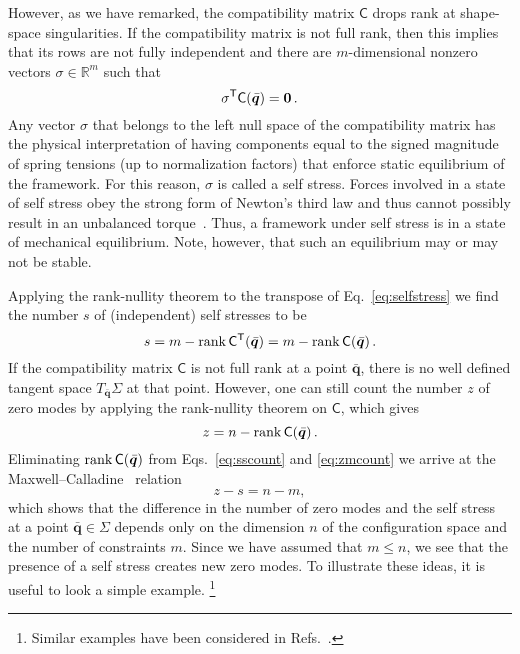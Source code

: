 However, as we have remarked, the compatibility matrix $\mathsf{C}$ drops rank at shape-space singularities.
If the compatibility matrix is not full rank, then this implies that its rows are not fully independent and there are $m$-dimensional nonzero vectors $\sigma \in \mathbb{R}^m$ such that
%
\begin{equation}
  \sigma^\mathsf{T}\mathsf{C}(\bar{\bm{q}}) = \bm{0}\,.\label{eq:selfstress}
\end{equation}
%
Any vector $\sigma$ that belongs to the left null space of the compatibility matrix has the physical interpretation of having components equal to the signed magnitude of spring tensions (up to normalization factors) that enforce static equilibrium of the framework.
For this reason, $\sigma$ is called a self stress.
Forces involved in a state of self stress obey the strong form of Newton's third law and thus cannot possibly result in an unbalanced torque~\cite{goldstein2002}.
Thus, a framework under self stress is in a state of mechanical equilibrium.
Note, however, that such an equilibrium may or may not be stable.

Applying the rank-nullity theorem to the transpose of Eq.~\eqref{eq:selfstress} we find the number $s$ of (independent) self stresses to be
%
\begin{equation}
  s = m - \operatorname{rank}{\mathsf{C}^\mathsf{T}(\bar{\bm{q}})} = m - \operatorname{rank}{\mathsf{C}(\bar{\bm{q}})}\,.\label{eq:sscount}
\end{equation}
%
If the compatibility matrix $\mathsf{C}$ is not full rank at a point $\bar{\bm{q}}$, there is no well defined tangent space $T_{\bar{\bm{q}}}\Sigma$ at that point.
However, one can still count the number $z$ of zero modes by applying the rank-nullity theorem on $\mathsf{C}$, which gives
\begin{equation}
  z = n - \operatorname{rank}{\mathsf{C}(\bar{\bm{q}})}\label{eq:zmcount}\,.
\end{equation}
Eliminating $\operatorname{rank}{\mathsf{C}(\bar{\bm{q}})}$ from Eqs.~\eqref{eq:sscount} and \eqref{eq:zmcount} we arrive at the Maxwell--Calladine~\cite{maxwell1864,calladine1978} relation
%
\begin{equation}
  z - s = n - m,
  \label{eq:mcindex}
\end{equation}
%
which shows that the difference in the number of zero modes and the self stress at a point $\bar{\bm{q}} \in \Sigma$ depends only on the dimension $n$ of the configuration space and the number of constraints $m$.
Since we have assumed that $m \leq n$, we see that the presence of a self stress creates new zero modes.
To illustrate these ideas, it is useful to look a simple example.%
\footnote{Similar examples have been considered in Refs.~\cite{calladine1978,lengyel2002,zhang2016,woodhouse2018}.}


